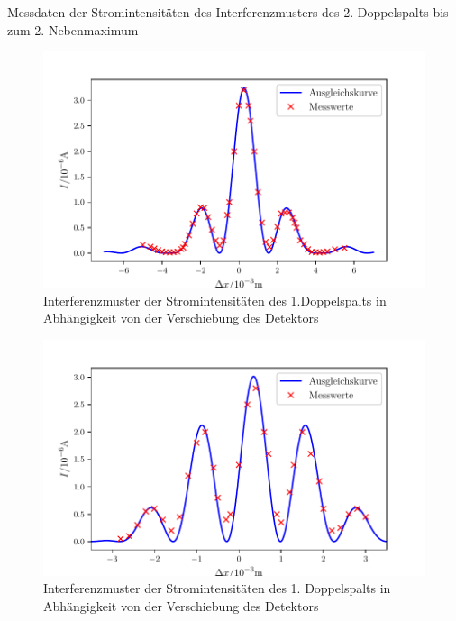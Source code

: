 \begin{table}
	\centering
	\caption{Messdaten der Stromintensitäten des Interferenzmusters des 2. Doppelspalts bis zum 2. Nebenmaximum}
	
	\label{tab:3}
\end{table}


\begin{figure}
\centering
\includegraphics[width=\linewidth-70pt,height=\textheight-70pt,keepaspectratio]{content/images/Doppelspalt1.pdf}
\caption{Interferenzmuster der Stromintensitäten des 1.Doppelspalts in Abhängigkeit von der Verschiebung des Detektors}
\label{fig:Doppel1}
\end{figure}

\begin{figure}
\centering
\includegraphics[width=\linewidth-70pt,height=\textheight-70pt,keepaspectratio]{content/images/Doppelspalt2.pdf}
\caption{Interferenzmuster der Stromintensitäten des 1. Doppelspalts in Abhängigkeit von der Verschiebung des Detektors}
\label{fig:Doppel2}
\end{figure}